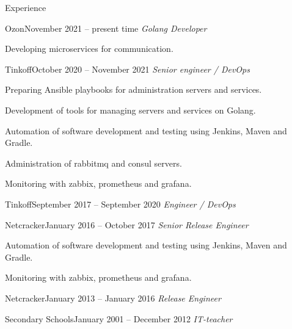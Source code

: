\documentclass{resume} %
\begin{document}
\begin{rSection}{Experience}

\begin{rSubsection}{Ozon}{November 2021 -- present time}{}{} %
{\em Golang Developer\/} \par
\item Developing microservices for communication.
\end{rSubsection}

\begin{rSubsection}{Tinkoff}{October 2020 -- November 2021}{}{} %
{\em Senior engineer / DevOps\/} \par
\item Preparing Ansible playbooks for administration servers and services.
\item Development of tools for managing servers and services on Golang.
\item Automation of software development and testing using Jenkins, Maven and Gradle.
\item Administration of rabbitmq and consul servers.
\item Monitoring with zabbix, prometheus and grafana.
\end{rSubsection}

\begin{rSubsection}{Tinkoff}{September 2017 -- September 2020}{}{} %
{\em Engineer / DevOps\/} \par
\end{rSubsection}

\begin{rSubsection}{Netcracker}{January 2016 -- October 2017}{}{} %
{\em Senior Release Engineer\/} \par
\item Automation of software development and testing using Jenkins, Maven and Gradle.
\item Monitoring with zabbix, prometheus and grafana.
\end{rSubsection}

\begin{rSubsection}{Netcracker}{January 2013 -- January 2016}{}{} %
{\em Release Engineer\/} \par
\end{rSubsection}

\begin{rSubsection}{Secondary Schools}{January 2001 -- December 2012}{}{} %
{\em IT-teacher\/}
\end{rSubsection}


\end{rSection}
\end{document}
